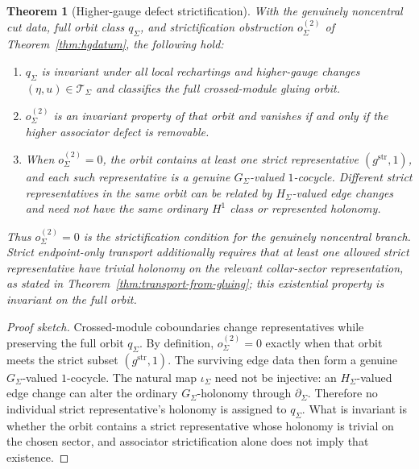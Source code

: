 \documentclass[11pt]{article}
\newtheorem{theorem}{Theorem}[section]
\begin{document}
\begin{theorem}[Higher-gauge defect strictification]\label{thm:hgtransport}
With the genuinely noncentral cut data, full orbit class \(q_\Sigma\), and strictification
obstruction \(o^{(2)}_\Sigma\) of Theorem~\ref{thm:hgdatum}, the following hold:
\begin{enumerate}[leftmargin=2em]
\item \(q_\Sigma\) is invariant under all local rechartings and higher-gauge changes \((\eta,u)\in \mathcal T_\Sigma\) and classifies the full crossed-module gluing orbit.
\item \(o^{(2)}_\Sigma\) is an invariant property of that orbit and vanishes if and only if the
higher associator defect is removable.
\item When \(o^{(2)}_\Sigma=0\), the orbit contains at least one strict representative
\((g^{\mathrm{str}},1)\), and each such representative is a genuine \(G_\Sigma\)-valued
\(1\)-cocycle. Different strict representatives in the same orbit can be related by
\(H_\Sigma\)-valued edge changes and need not have the same ordinary \(H^1\) class or represented
holonomy.
\end{enumerate}
Thus \(o^{(2)}_\Sigma=0\) is the strictification condition for the genuinely noncentral branch. Strict
endpoint-only transport additionally requires that at least one allowed strict representative have
trivial holonomy on the relevant collar-sector representation, as stated in
Theorem~\ref{thm:transport-from-gluing}; this existential property is invariant on the full orbit.
\end{theorem}

\begin{proof}[Proof sketch]
Crossed-module coboundaries change representatives while preserving the full orbit \(q_\Sigma\).
By definition, \(o^{(2)}_\Sigma=0\) exactly when that orbit meets the strict subset
\((g^{\mathrm{str}},1)\). The surviving edge data then form a genuine \(G_\Sigma\)-valued
\(1\)-cocycle. The natural map \(\iota_\Sigma\) need not be injective: an
\(H_\Sigma\)-valued edge change can alter the ordinary \(G_\Sigma\)-holonomy through
\(\partial_\Sigma\). Therefore no individual strict representative's holonomy is assigned to
\(q_\Sigma\). What is invariant is whether the orbit contains a strict representative whose
holonomy is trivial on the chosen sector, and associator strictification alone does not imply that
existence.
\end{proof}
\end{document}

